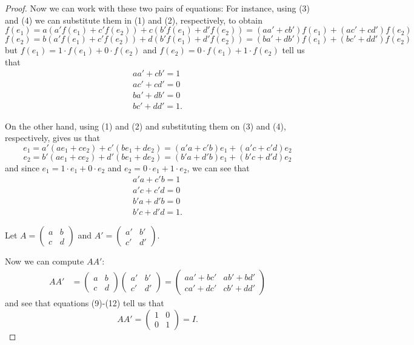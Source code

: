 \begin{proof}
	Now we can work with these two pairs of equations: For instance, using (3) and (4) we can substitute them in (1) and (2), respectively, to obtain
	\[f(e_1)=a(a'f(e_1)+c'f(e_2))+c(b'f(e_1)+d'f(e_2))=(aa'+cb')f(e_1)+(ac'+cd')f(e_2)\]\[f(e_2)=b(a'f(e_1)+c'f(e_2))+d(b'f(e_1)+d'f(e_2))=(ba'+db')f(e_1)+(bc'+dd')f(e_2)\]but $f(e_1)=1\cdot f(e_1)+0\cdot f(e_2)$ and $f(e_2)=0\cdot f(e_1)+1\cdot f(e_2)$ tell us that 
	\begin{gather}
		aa'+cb'=1\\
		ac'+cd'=0\\
		ba'+db'=0\\
		bc'+dd'=1.
	\end{gather}
	
	On the other hand, using (1) and (2) and substituting them on (3) and (4), respectively, gives us that
	\[e_1=a'(ae_1+ce_2)+c'(be_1+de_2)=(a'a+c'b)e_1+(a'c+c'd)e_2\]
	\[e_2=b'(ae_1+ce_2)+d'(be_1+de_2)=(b'a+d'b)e_1+(b'c+d'd)e_2\]and since $e_1=1\cdot e_1+0\cdot e_2$ and $e_2=0\cdot e_1+1\cdot e_2$, we can see that
	\begin{gather}
		a'a+c'b=1\\
		a'c+c'd=0\\
		b'a+d'b=0\\
		b'c+d'd=1.
	\end{gather}
	
	Let $A=\begin{pmatrix}
	a&b\\c&d
	\end{pmatrix}$ and $A'=\begin{pmatrix}
	a'&b'\\c'&d'
	\end{pmatrix}$.
	
	Now we can compute $AA'$:
	\begin{align*}
		AA'&=\begin{pmatrix}
		a&b\\c&d
		\end{pmatrix}\begin{pmatrix}
		a'&b'\\c'&d'
		\end{pmatrix}=\begin{pmatrix}
		aa'+bc'&ab'+bd'\\
		ca'+dc'&cb'+dd'
		\end{pmatrix}
	\end{align*}and see that equations (9)-(12) tell us that
	\[AA'=\begin{pmatrix}
	1&0\\0&1
	\end{pmatrix}=I.\]
	

\end{proof}
